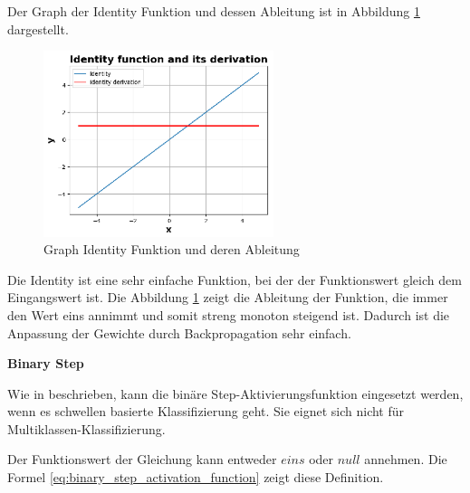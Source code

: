 
Der Graph der Identity Funktion und dessen Ableitung ist in Abbildung \ref{img:identity_func_graph} dargestellt. 

\begin{figure}[!ht]
	\includegraphics[width=0.6\textwidth]{content/chapter_basics/plots/identity_func_plot.eps}
	\centering
	\caption{Graph Identity Funktion und deren Ableitung}
	\label{img:identity_func_graph}
\end{figure}

Die Identity ist eine sehr einfache Funktion, bei der der Funktionswert gleich dem Eingangswert ist. Die Abbildung \ref{img:identity_func_graph} zeigt die Ableitung der Funktion, die immer den Wert eins annimmt und somit streng monoton steigend ist. Dadurch ist die Anpassung der Gewichte durch Backpropagation sehr einfach.\vspace{0.2cm}

%
\textbf{Binary Step}\vspace{0.2cm}

Wie in \cite[311-312]{sharma-2020} beschrieben, kann die binäre Step-Aktivierungsfunktion eingesetzt werden, wenn es schwellen basierte Klassifizierung geht. Sie eignet sich nicht für Multiklassen-Klassifizierung.

Der Funktionswert der Gleichung kann entweder $eins$ oder $null$ annehmen. Die Formel \ref{eq:binary_step_activation_function} zeigt diese Definition.



